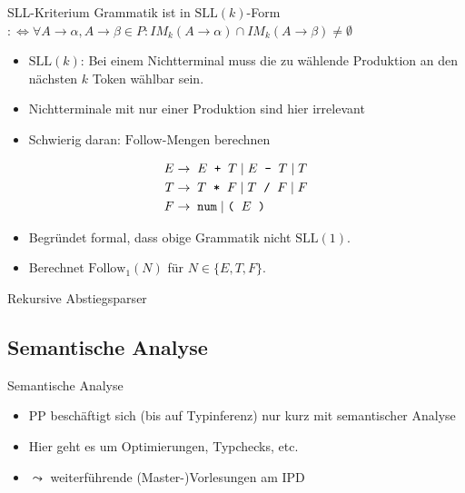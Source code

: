 \documentclass{beamer}
\begin{document}
\begin{frame}{SLL-Kriterium}
	Grammatik ist in $\textrm{SLL}(k)$-Form\\
	$:\Leftrightarrow \forall A \to \alpha, A \to \beta \in P: IM_k(A \to \alpha) \cap IM_k(A \to \beta) \neq \emptyset$

	\begin{itemize}
		\item $\textrm{SLL}(k)$: Bei einem Nichtterminal muss die zu wählende Produktion an den nächsten $k$ Token wählbar sein.
		\item Nichtterminale mit nur einer Produktion sind hier irrelevant
		\item Schwierig daran: $\textrm{Follow}$-Mengen berechnen
	\end{itemize}
	\pause
	\begin{align*}
		E \to & \;\; E \;\; \textrm{\texttt{+}} \;\; T \mid E \;\; \textrm{\texttt{-}} \;\; T \mid T\\
		T \to & \;\; T \;\; \textrm{\texttt{*}} \;\; F \mid T \;\; \textrm{\texttt{/}} \;\; F \mid F\\
		F \to & \;\; \textrm{\texttt{num}} \; | \; \textrm{\texttt{(}} \;\; E \;\; \textrm{\texttt{)}}
	\end{align*}
	
	\begin{itemize}
		\item Begründet formal, dass obige Grammatik nicht $\textrm{SLL}(1)$.
		\item Berechnet $\textrm{Follow}_1(N)$ für $N \in \{ E, T, F \}$.
	\end{itemize}
\end{frame}

\begin{frame}{Rekursive Abstiegsparser}
\end{frame}

\subsection{Semantische Analyse}

\begin{frame}{Semantische Analyse}
	\begin{itemize}
		\item PP beschäftigt sich (bis auf Typinferenz) nur kurz mit semantischer Analyse
		\item Hier geht es um Optimierungen, Typchecks, etc.
		\item $\leadsto$ weiterführende (Master-)Vorlesungen am IPD
	\end{itemize}
\end{frame}
\end{document}
